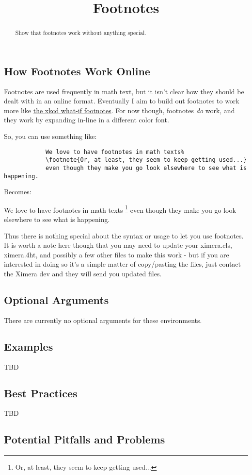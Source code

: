 \documentclass{ximera}
\title{Footnotes}
\begin{document}
\begin{abstract}
    Show that footnotes work without anything special.
\end{abstract}
\maketitle

    \subsection*{How Footnotes Work Online}
        Footnotes are used frequently in math text, but it isn't clear how they should be dealt with in an online format. Eventually I aim to build out footnotes to work more like \href{https://what-if.xkcd.com/}{the xkcd what-if footnotes}. For now though, footnotes \textit{do} work, and they work by expanding in-line in a different color font.
        
        So, you can use something like:
        
        \begin{verbatim}
            We love to have footnotes in math texts%
            \footnote{Or, at least, they seem to keep getting used...}
            even though they make you go look elsewhere to see what is happening.
        \end{verbatim}
        
        Becomes:
        
        We love to have footnotes in math texts%
        \footnote{Or, at least, they seem to keep getting used...}
        even though they make you go look elsewhere to see what is happening.
        
        Thus there is nothing special about the syntax or usage to let you use footnotes. It is worth a note here though that you may need to update your ximera.cls, ximera.4ht, and possibly a few other files to make this work - but if you are interested in doing so it's a simple matter of copy/pasting the files, just contact the Ximera dev and they will send you updated files.


        
    \subsection*{Optional Arguments}
        There are currently no optional arguments for these environments.

    \subsection*{Examples}
    
        TBD
        
    \subsection*{Best Practices}
    
        TBD
        
    
    \subsection*{Potential Pitfalls and Problems}
\end{document}
